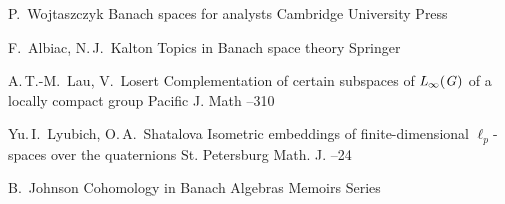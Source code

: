 \documentclass{article}
\theoremstyle{plain}
\theoremstyle{definition}
\begin{document}
\begin{thebibliography}{99}
\by P.~Wojtaszczyk 
\book Banach spaces for analysts 
\publ Cambridge University Press

\by F.~Albiac, N.\,J.~Kalton 
\book Topics in Banach space theory
\publ Springer

\by A.\,T.-M.~Lau,  V.~Losert
\paper Complementation of certain subspaces of $\it{L_\infty(G)}$ of a locally compact group
\jour Pacific J. Math
--310

\by Yu.\,I.~Lyubich, O.\,A.~Shatalova
\paper Isometric embeddings of finite-dimensional $\ell_p$-spaces over the quaternions
\jour St. Petersburg Math. J.
--24

\by B.~Johnson
\book Cohomology in Banach Algebras 
\publ Memoirs Series

\end{thebibliography}
\end{document}
